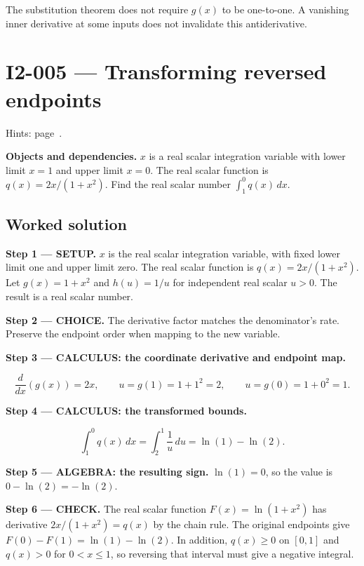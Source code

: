 \documentclass[11pt,oneside,openany]{book}
\begin{document}
The substitution theorem does not require \(g(x)\) to be one-to-one. A vanishing
inner derivative at some inputs does not invalidate this antiderivative.
\clearpage
\section{I2-005 --- Transforming reversed endpoints}
\label{problem:I2-005}
{\small Hints: page~\pageref{hints:I2-005}.}\par\medskip

\textbf{Objects and dependencies.} \(x\) is a real scalar integration variable with
lower limit \(x=1\) and upper limit \(x=0\). The real scalar function is
\(q(x)=2x/(1+x^2)\). Find the real scalar number \(\int_1^0q(x)\,dx\).
\subsection*{Worked solution}

\textbf{Step 1 --- SETUP.} \(x\) is the real scalar integration variable, with fixed
lower limit one and upper limit zero. The real scalar function is
\(q(x)=2x/(1+x^2)\). Let \(g(x)=1+x^2\) and \(h(u)=1/u\) for independent real scalar
\(u>0\). The result is a real scalar number.

\begin{ChoiceStep}
\textbf{Step 2 --- CHOICE.} The derivative factor matches the denominator's rate.
Preserve the endpoint order when mapping to the new variable.

\end{ChoiceStep}
\textbf{Step 3 --- CALCULUS: the coordinate derivative and endpoint map.}

\[
\frac{d}{dx}\left(g(x)\right)=2x,
\qquad u=g(1)=1+1^2=2,\qquad u=g(0)=1+0^2=1.
\]

\textbf{Step 4 --- CALCULUS: the transformed bounds.}

\[
\int_1^0q(x)\,dx=\int_2^1\frac1u\,du=\ln(1)-\ln(2).
\]

\begingroup\color{AlgebraBlue}
\textbf{Step 5 --- ALGEBRA: the resulting sign.} \(\ln(1)=0\), so the value is
\(0-\ln(2)=-\ln(2)\).

\endgroup
\textbf{Step 6 --- CHECK.} The real scalar function \(F(x)=\ln(1+x^2)\) has derivative
\(2x/(1+x^2)=q(x)\) by the chain rule. The original endpoints give
\(F(0)-F(1)=\ln(1)-\ln(2)\). In addition, \(q(x)\ge0\) on \([0,1]\) and
\(q(x)>0\) for \(0<x\le1\), so reversing that interval must give a negative integral.
\end{document}
